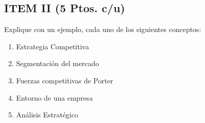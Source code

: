 \documentclass{templateNote}
\begin{document}
\newpage
\subsection*{ITEM II (5 Ptos. c/u)}
Explique con un ejemplo, cada uno de los siguientes conceptos:
\begin{enumerate}
    \item Estrategia Competitiva
    \item Segmentación del mercado
    \item Fuerzas competitivas de Porter
    \item Entorno de una empresa
    \item Análisis Estratégico
\end{enumerate}
\end{document}
